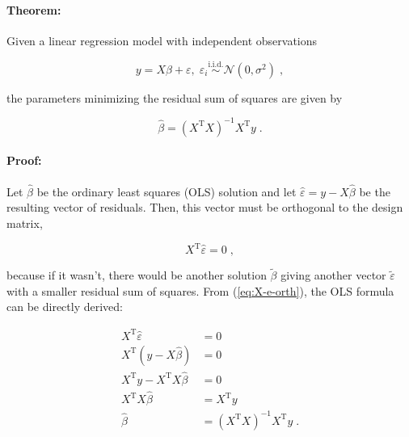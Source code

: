 

\setcounter{equation}{0}



\paragraph{Theorem:}

Given a linear regression model with independent observations

\begin{equation} \label{eq:mlr}
y = X\beta + \varepsilon, \; \varepsilon_i \overset{\mathrm{i.i.d.}}{\sim} \mathcal{N}(0, \sigma^2) \; ,
\end{equation}

the parameters minimizing the residual sum of squares are given by

\begin{equation} \label{eq:mlr-ols}
\hat{\beta} = (X^\mathrm{T} X)^{-1} X^\mathrm{T} y \; .
\end{equation}


\paragraph{Proof:} Let $\hat{\beta}$ be the ordinary least squares (OLS) solution and let $\hat{\varepsilon} = y - X\hat{\beta}$ be the resulting vector of residuals. Then, this vector must be orthogonal to the design matrix,

\begin{equation} \label{eq:X-e-orth}
X^\mathrm{T} \hat{\varepsilon} = 0 \; ,
\end{equation}

because if it wasn't, there would be another solution $\tilde{\beta}$ giving another vector $\tilde{\varepsilon}$ with a smaller residual sum of squares. From (\ref{eq:X-e-orth}), the OLS formula can be directly derived:

\vspace{-0.5em}
\begin{equation} \label{eq:mlr-ols-proof}
\begin{split}
X^\mathrm{T} \hat{\varepsilon} &= 0 \\
X^\mathrm{T} \left( y - X\hat{\beta} \right) &= 0 \\
X^\mathrm{T} y - X^\mathrm{T} X\hat{\beta} &= 0 \\
X^\mathrm{T} X\hat{\beta} &= X^\mathrm{T} y \\
\hat{\beta} &= (X^\mathrm{T} X)^{-1} X^\mathrm{T} y \; .
\end{split}
\end{equation}

